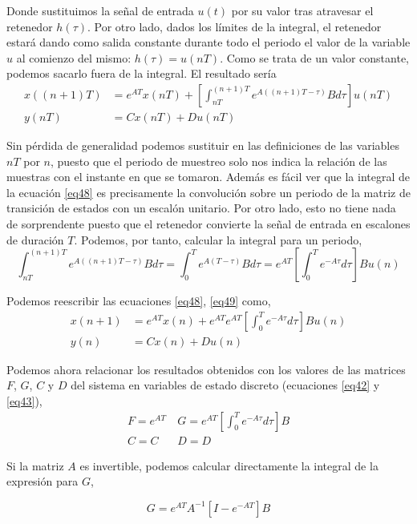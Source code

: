 \documentclass[10pt,a4paper]{report}
\begin{document}
Donde sustituimos la señal de entrada $u(t)$ por su valor tras atravesar el retenedor $h(\tau)$. Por otro lado, dados los límites de la integral, el retenedor estará dando como salida constante durante todo el periodo el valor de la variable $u$ al comienzo del mismo: $h(\tau) = u(nT)$. Como se trata de un valor constante, podemos sacarlo fuera de la integral. El resultado sería
\begin{align}
x((n+1)T) &= e^{AT}x(nT) + \left[\int_{nT}^{(n+1)T} e^{A((n+1)T-\tau)}Bd\tau\right] u(nT) \label{eq48}\\ 
y(nT) &= Cx(nT) + Du(nT) \label{eq49}
\end{align}

Sin pérdida de generalidad podemos sustituir en las definiciones de las variables $nT$ por $n$, puesto que el periodo de muestreo solo nos indica la relación de las muestras con el instante en que se tomaron. Además es fácil ver que la integral de la ecuación \ref{eq48} es precisamente la convolución sobre un periodo de la matriz de transición de estados con un escalón unitario. Por otro lado, esto no tiene nada de sorprendente puesto que el retenedor convierte la señal de entrada en escalones de duración $T$. Podemos, por tanto, calcular la integral para un periodo,
\begin{equation}
\int_{nT}^{(n+1)T} e^{A((n+1)T-\tau)}Bd\tau = \int_0^Te^{A(T-\tau)}Bd\tau = e^{AT}\left[\int_0^Te^{-A\tau}d\tau \right]Bu(n)
\end{equation}

Podemos reescribir las ecuaciones \ref{eq48}, \ref{eq49} como,
\begin{align}
x(n+1) &= e^{AT}x(n) + e^{AT}e^{AT}\left[\int_0^Te^{-A\tau}d\tau \right]Bu(n) \label{eq411}\\
y(n) &= Cx(n) + Du(n) \label{eq411}
\end{align}

Podemos  ahora relacionar los resultados obtenidos con los valores de las matrices $F$, $G$, $C$ y $D$ del sistema en variables de estado discreto (ecuaciones \ref{eq42} y \ref{eq43}), 
\begin{align}
F = e^{AT} & \ G = e^{AT}\left[\int_0^Te^{-A\tau}d\tau \right]B\\
C = C\ \ \  & \ D=D
\end{align}

Si la matriz $A$ es invertible, podemos calcular directamente la integral de la expresión para $G$,

\begin{equation*}
	G = e^{AT}A^{-1}\left[I-e^{-AT}\right]B
\end{equation*}
\end{document}
